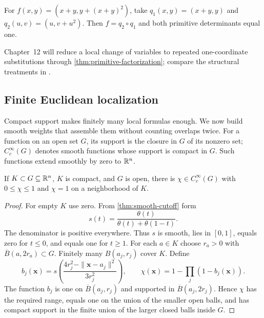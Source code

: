 \begin{example}
For $f(x,y)=(x+y,y+(x+y)^2)$, take
$q_1(x,y)=(x+y,y)$ and $q_2(u,v)=(u,v+u^2)$.
Then $f=q_2\circ q_1$ and both primitive determinants equal one.
\end{example}
Chapter~12 will reduce a local change of variables to repeated
one-coordinate substitutions through \cref{thm:primitive-factorization};
compare the structural treatments in
\cite{knapp-basic-real,munkres-analysis,rudin-pma}.

\subsection{Finite Euclidean localization}
Compact support makes finitely many local formulas enough. We now build
smooth weights that assemble them without counting overlaps twice.
\label{def:euclidean-function-support}
For a function on an open set $G$, its support is the closure in $G$ of
its nonzero set; $C_c^\infty(G)$ denotes smooth functions whose support
is compact in $G$. Such functions extend smoothly by zero to $\mathbb{R}^n$.

\begin{lemma}\label{lem:euclidean-cutoff}\label{cor:compact-cutoff}
If $K\subset G\subseteq\mathbb{R}^n$, $K$ is compact, and $G$ is open, there
is $\chi\in C_c^\infty(G)$ with $0\leq\chi\leq1$ and $\chi=1$
on a neighborhood of $K$.
\end{lemma}
\begin{proof}
For empty $K$ use zero. From \cref{thm:smooth-cutoff} form
\[
s(t)=\frac{\theta(t)}{\theta(t)+\theta(1-t)}.
\]
The denominator is positive everywhere. Thus $s$ is smooth, lies in
$[0,1]$, equals zero for $t\leq0$, and equals one for $t\geq1$.
For each $a\in K$ choose $r_a>0$ with $\overline B(a,2r_a)\subset G$.
Finitely many $B(a_j,r_j)$ cover $K$. Define
\[
b_j(\mathbf{x})=s\left(\frac{4r_j^2-\|\mathbf{x}-a_j\|^2}{3r_j^2}\right),
\qquad \chi(\mathbf{x})=1-\prod_j(1-b_j(\mathbf{x})).
\]
The function $b_j$ is one on $\overline B(a_j,r_j)$ and supported in
$\overline B(a_j,2r_j)$. Hence $\chi$ has the required range, equals
one on the union of the smaller open balls, and has compact support in
the finite union of the larger closed balls inside $G$.
\end{proof}

